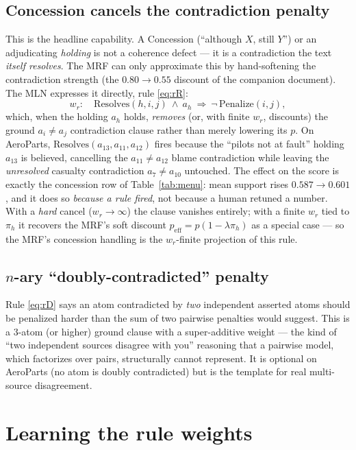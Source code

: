 \documentclass[11pt]{article}
\begin{document}
\subsection{Concession cancels the contradiction penalty}
\label{sec:concession}
This is the headline capability. A Concession (``although $X$, still $Y$'') or an adjudicating
\emph{holding} is not a coherence defect --- it is a contradiction the text \emph{itself
resolves}. The MRF can only approximate this by hand-softening the contradiction strength
(the $0.80\!\to\!0.55$ discount of the companion document). The MLN expresses it directly,
rule \eqref{eq:rR}:
\[
   w_r:\quad \mathrm{Resolves}(h,i,j)\ \wedge\ a_h\ \Rightarrow\ \neg\,\mathrm{Penalize}(i,j),
\]
which, when the holding $a_h$ holds, \emph{removes} (or, with finite $w_r$, discounts) the
ground $a_i\!\neq\!a_j$ contradiction clause rather than merely lowering its $p$. On
AeroParts, $\mathrm{Resolves}(a_{13},a_{11},a_{12})$ fires because the ``pilots not at fault''
holding $a_{13}$ is believed, cancelling the $a_{11}\!\neq\!a_{12}$ blame contradiction while
leaving the \emph{unresolved} casualty contradiction $a_7\!\neq\!a_{10}$ untouched. The effect
on the score is exactly the concession row of Table~\ref{tab:menu}: mean support rises
$0.587\!\to\!0.601$, and it does so \emph{because a rule fired}, not because a human retuned a
number. With a \emph{hard} cancel ($w_r\!\to\!\infty$) the clause vanishes entirely; with a
finite $w_r$ tied to $\pi_h$ it recovers the MRF's soft discount $p_{\text{eff}}=p(1-\lambda\pi_h)$
as a special case --- so the MRF's concession handling is the $w_r$-finite projection of this
rule.

\subsection{$n$-ary ``doubly-contradicted'' penalty}
Rule \eqref{eq:rD} says an atom contradicted by \emph{two} independent asserted atoms should
be penalized harder than the sum of two pairwise penalties would suggest. This is a $3$-atom
(or higher) ground clause with a super-additive weight --- the kind of ``two independent
sources disagree with you'' reasoning that a pairwise model, which factorizes over pairs,
structurally cannot represent. It is optional on AeroParts (no atom is doubly contradicted)
but is the template for real multi-source disagreement.

\section{Learning the rule weights}
\label{sec:learn}
\end{document}
